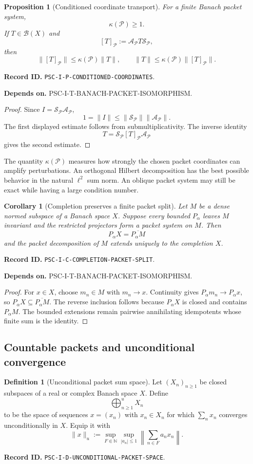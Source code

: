 \documentclass[11pt]{article}
\newtheorem{proposition}[proposition]{Proposition}
\newtheorem{corollary}[corollary]{Corollary}
\theoremstyle{definition}
\newtheorem{definition}[definition]{Definition}
\theoremstyle{remark}
\newcommand{\Pcal}{\mathcal P}
\newcommand{\cl}[1]{\overline{#1}}
\newcommand{\RecordID}[1]{\par\smallskip\noindent\begingroup\footnotesize\color{PSCGray}\raggedright\textbf{Record ID.} \nolinkurl{#1}.\par\endgroup}
\newcommand{\Depends}[1]{\par\noindent\begingroup\footnotesize\color{PSCGray}\raggedright\textbf{Depends on.} #1\par\endgroup}
\begin{document}
\begin{proposition}[Conditioned coordinate transport]
\label{prop:conditioned-coordinates}
For a finite Banach packet system,
\[
\kappa(\Pcal)\geq1.
\]
If $T\in\mathcal B(X)$ and
\[
[T]_{\Pcal}:=\mathcal A_{\Pcal}T\mathcal S_{\Pcal},
\]
then
\[
\boxed{
\|[T]_{\Pcal}\|
\leq\kappa(\Pcal)\|T\|,
\qquad
\|T\|
\leq\kappa(\Pcal)\|[T]_{\Pcal}\|.
}
\]
\end{proposition}
\RecordID{PSC-I-P-CONDITIONED-COORDINATES}
\Depends{PSC-I-T-BANACH-PACKET-ISOMORPHISM.}

\begin{proof}
Since $I=\mathcal S_{\Pcal}\mathcal A_{\Pcal}$,
\[
1=\|I\|\leq\|\mathcal S_{\Pcal}\|\|\mathcal A_{\Pcal}\|.
\]
The first displayed estimate follows from submultiplicativity.  The inverse identity
\[
T=\mathcal S_{\Pcal}[T]_{\Pcal}\mathcal A_{\Pcal}
\]
gives the second estimate.
\end{proof}

\begin{interpretation}
The quantity \(\kappa(\Pcal)\) measures how strongly the chosen packet coordinates can amplify perturbations.  An orthogonal Hilbert decomposition has the best possible behavior in the natural \(\ell^2\) sum norm.  An oblique packet system may still be exact while having a large condition number.
\end{interpretation}


\begin{corollary}[Completion preserves a finite packet split]
\label{cor:completion-packet-split}
Let $M$ be a dense normed subspace of a Banach space $X$.  Suppose every bounded $P_\alpha$ leaves $M$ invariant and the restricted projectors form a packet system on $M$.  Then
\[
P_\alpha X=\cl{P_\alpha M}
\]
and the packet decomposition of $M$ extends uniquely to the completion $X$.
\end{corollary}
\RecordID{PSC-I-C-COMPLETION-PACKET-SPLIT}
\Depends{PSC-I-T-BANACH-PACKET-ISOMORPHISM.}

\begin{proof}
For $x\in X$, choose $m_n\in M$ with $m_n\to x$.  Continuity gives $P_\alpha m_n\to P_\alpha x$, so $P_\alpha X\subseteq\cl{P_\alpha M}$.  The reverse inclusion follows because $P_\alpha X$ is closed and contains $P_\alpha M$.  The bounded extensions remain pairwise annihilating idempotents whose finite sum is the identity.
\end{proof}

\subsection{Countable packets and unconditional convergence}
\begin{definition}[Unconditional packet sum space]
\label{def:unconditional-packet-space}
Let $(X_n)_{n\geq1}$ be closed subspaces of a real or complex Banach space $X$.  Define
\[
\bigoplus_{n\geq1}^{u}X_n
\]
to be the space of sequences $x=(x_n)$ with $x_n\in X_n$ for which $\sum_nx_n$ converges unconditionally in $X$.  Equip it with
\[
\|x\|_u
:=
\sup_{F\Subset\mathbb N}
\sup_{|a_n|\leq1}
\left\|\sum_{n\in F}a_nx_n\right\|.
\]
\end{definition}
\RecordID{PSC-I-D-UNCONDITIONAL-PACKET-SPACE}
\end{document}

